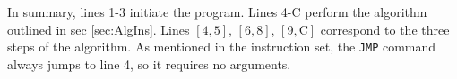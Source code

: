 In summary, lines 1-3 initiate the program. Lines 4-C perform the algorithm outlined in sec \ref{sec:AlgIns}. Lines $[4,5]$, $[6,8]$, $[9,\text{C}]$ correspond to the three steps of the algorithm. As mentioned in the instruction set, the \texttt{JMP} command always jumps to line 4, so it requires no arguments.


